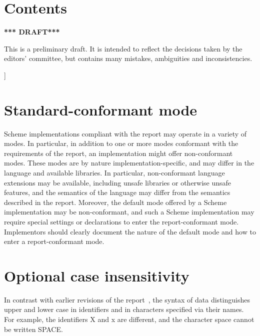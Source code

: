 \documentclass[twoside,twocolumn]{algol60}
\begin{document}
{\chapter*{Contents}
\addvspace{3.5pt}                  %
{%
\tableofcontents
}

\bigskip

\begin{center}
{\large \bf
*** DRAFT*** \\
}\end{center}

This is a preliminary draft.  It is intended to reflect the decisions
taken by the editors' committee, but contains many mistakes,
ambiguities and inconsistencies.

}]

\vfill

\texonly\clearpage\endtexonly

\appendix

\chapter{Standard-conformant mode}
\label{standardconformantmode}

Scheme implementations compliant with the report may operate in a
variety of modes.  In particular, in addition to one or more modes
conformant with the requirements of the report, an implementation
might offer non-conformant modes.  These modes are by nature
implementation-specific, and may differ in the language and available
libraries.  In particular, non-conformant language extensions may be
available, including unsafe libraries or otherwise unsafe features,
and the semantics of the language may differ from the semantics
described in the report.  Moreover, the default mode offered by a
Scheme implementation may be non-conformant, and such a Scheme
implementation may require special settings or declarations to enter
the report-conformant mode.  Implementors should clearly
document the nature of the default mode and how to enter a
report-conformant mode.

\chapter{Optional case insensitivity}
\label{caseinsensitivityappendix}

In contrast with earlier revisions of the report~\cite{R5RS}, the
syntax of data distinguishes upper and lower case in identifiers and in
characters specified via their names.  For example, the identifiers
{\cf X} and {\cf x} are different, and the character
{\cf\sharpsign\backwhack{}space} cannot be written
{\cf\sharpsign\backwhack{}SPACE}.
\end{document}
